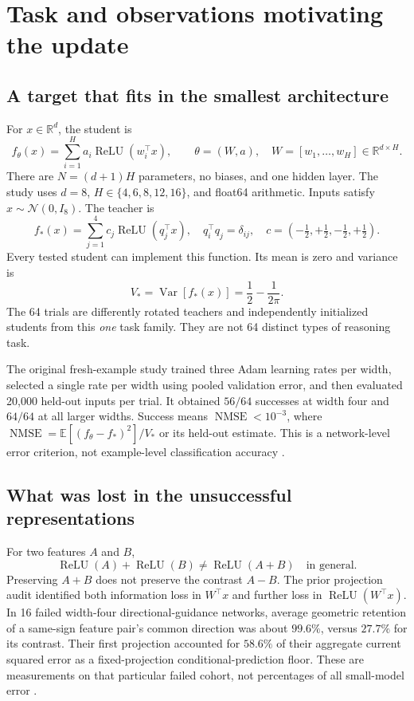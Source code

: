 \documentclass[11pt,letterpaper]{article}
\theoremstyle{remark}\newtheorem{remark}{Remark}
\newcommand{\R}{\mathbb R}
\newcommand{\E}{\mathbb E}
\newcommand{\Var}{\operatorname{Var}}
\newcommand{\relu}{\operatorname{ReLU}}
\newcommand{\NMSE}{\operatorname{NMSE}}
\begin{document}
\section{Task and observations motivating the update}\label{sec:task}
\subsection{A target that fits in the smallest architecture}
For $x\in\R^d$, the student is
\begin{equation}\label{eq:model}
f_\theta(x)=\sum_{i=1}^{H}a_i\relu(w_i^\top x),\qquad
\theta=(W,a),\quad W=[w_1,\ldots,w_H]\in\R^{d\times H}.
\end{equation}
There are $N=(d+1)H$ parameters, no biases, and one hidden layer. The study uses $d=8$, $H\in\{4,6,8,12,16\}$, and float64 arithmetic. Inputs satisfy $x\sim\mathcal N(0,I_8)$. The teacher is
\begin{equation}\label{eq:teacher}
f_*(x)=\sum_{j=1}^{4}c_j\relu(q_j^\top x),\quad
q_i^\top q_j=\delta_{ij},\quad
c=(-\tfrac12,+\tfrac12,-\tfrac12,+\tfrac12).
\end{equation}
Every tested student can implement this function. Its mean is zero and variance is
\begin{equation}\label{eq:var}
V_* = \Var[f_*(x)]=\frac12-\frac{1}{2\pi}.
\end{equation}
The 64 trials are differently rotated teachers and independently initialized students from this \emph{one} task family. They are not 64 distinct types of reasoning task.

The original fresh-example study trained three Adam learning rates per width, selected a single rate per width using pooled validation error, and then evaluated 20,000 held-out inputs per trial. It obtained $56/64$ successes at width four and $64/64$ at all larger widths. Success means $\NMSE<10^{-3}$, where $\NMSE=\E[(f_\theta-f_*)^2]/V_*$ or its held-out estimate. This is a network-level error criterion, not example-level classification accuracy \cite{artifactAnatomy}.

\subsection{What was lost in the unsuccessful representations}
For two features $A$ and $B$,
\begin{equation}\label{eq:merge}
\relu(A)+\relu(B)\ne\relu(A+B)\quad\text{in general}.
\end{equation}
Preserving $A+B$ does not preserve the contrast $A-B$. The prior projection audit identified both information loss in $W^\top x$ and further loss in $\relu(W^\top x)$. In 16 failed width-four directional-guidance networks, average geometric retention of a same-sign feature pair's common direction was about $99.6\%$, versus $27.7\%$ for its contrast. Their first projection accounted for $58.6\%$ of their aggregate current squared error as a fixed-projection conditional-prediction floor. These are measurements on that particular failed cohort, not percentages of all small-model error \cite{artifactProjection}.
\end{document}
